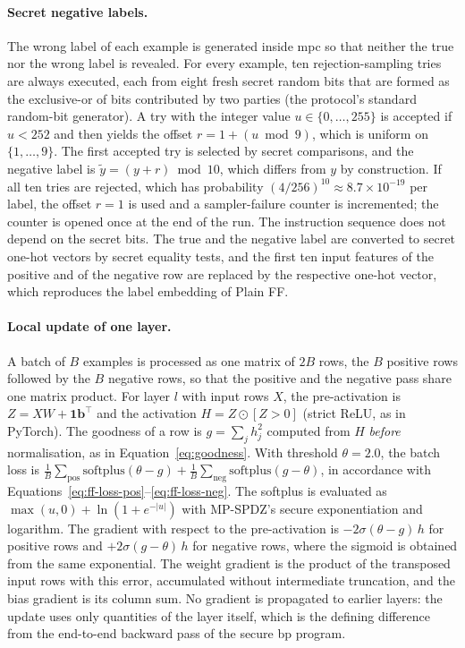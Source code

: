 \paragraph{Secret negative labels.} The wrong label of each example is generated inside \ac{mpc} so that neither the true nor the wrong label is revealed. For every example, ten rejection-sampling tries are always executed, each from eight fresh secret random bits that are formed as the exclusive-or of bits contributed by two parties (the protocol's standard random-bit generator). A try with the integer value $u\in\{0,\dots,255\}$ is accepted if $u<252$ and then yields the offset $r=1+(u \bmod 9)$, which is uniform on $\{1,\dots,9\}$. The first accepted try is selected by secret comparisons, and the negative label is $\tilde y=(y+r)\bmod 10$, which differs from $y$ by construction. If all ten tries are rejected, which has probability $(4/256)^{10}\approx8.7\times10^{-19}$ per label, the offset $r=1$ is used and a sampler-failure counter is incremented; the counter is opened once at the end of the run. The instruction sequence does not depend on the secret bits. The true and the negative label are converted to secret one-hot vectors by secret equality tests, and the first ten input features of the positive and of the negative row are replaced by the respective one-hot vector, which reproduces the label embedding of Plain FF.

\paragraph{Local update of one layer.} A batch of $B$ examples is processed as one matrix of $2B$ rows, the $B$ positive rows followed by the $B$ negative rows, so that the positive and the negative pass share one matrix product. For layer $l$ with input rows $X$, the pre-activation is $Z=XW+\mathbf{1}\mathbf{b}^\top$ and the activation $H=Z\odot[Z>0]$ (strict ReLU, as in PyTorch). The goodness of a row is $g=\sum_j h_j^2$ computed from $H$ \emph{before} normalisation, as in Equation~\eqref{eq:goodness}. With threshold $\theta=2.0$, the batch loss is $\frac1B\sum_{\text{pos}}\mathrm{softplus}(\theta-g)+\frac1B\sum_{\text{neg}}\mathrm{softplus}(g-\theta)$, in accordance with Equations~\eqref{eq:ff-loss-pos}--\eqref{eq:ff-loss-neg}. The softplus is evaluated as $\max(u,0)+\ln(1+e^{-|u|})$ with MP-SPDZ's secure exponentiation and logarithm. The gradient with respect to the pre-activation is $-2\sigma(\theta-g)\,h$ for positive rows and $+2\sigma(g-\theta)\,h$ for negative rows, where the sigmoid is obtained from the same exponential. The weight gradient is the product of the transposed input rows with this error, accumulated without intermediate truncation, and the bias gradient is its column sum. No gradient is propagated to earlier layers: the update uses only quantities of the layer itself, which is the defining difference from the end-to-end backward pass of the secure \ac{bp} program.

